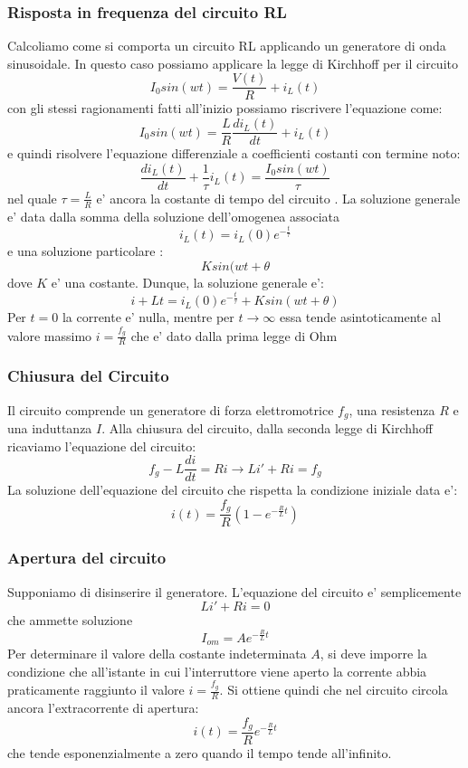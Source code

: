 \documentclass[a4paper, 10pt]{article}
\begin{document}
			\subsubsection{Risposta in frequenza del circuito RL}
				Calcoliamo come si comporta un circuito RL applicando un generatore di onda sinusoidale. In questo caso
				possiamo applicare la legge di Kirchhoff per il circuito 
				\[ I_0 sin(w t) = \frac{V(t)}{R} + i_L (t) \]
				con gli stessi ragionamenti fatti all'inizio possiamo riscrivere l'equazione come:
				\[ I_0 sin(wt) =  \frac{L}{R}\frac{di_L (t)}{dt} + i_L (t) \]
				e quindi risolvere l'equazione differenziale a coefficienti costanti con termine noto:
				\[ \frac{di_L (t)}{dt} + \frac{1}{\tau}i_L (t) = \frac{I_0 sin(wt)}{\tau}\]
				nel quale $\tau =\frac{L}{R}$ e' ancora la costante di tempo del circuito . La soluzione generale e' data
				dalla somma della soluzione dell'omogenea associata 
				\[ i_L(t) = i_L(0) e^{-\frac{t}{\tau}}\] e una soluzione particolare : \[ K sin(wt + \theta \] dove $K$ e' una
				costante. Dunque, la soluzione generale e':
				\[ i+L{t} = i_L(0)e^{-\frac{t}{\tau}} + Ksin(wt + \theta) \]
				Per $t = 0$ la corrente e' nulla, mentre per $t \rightarrow \infty$ essa tende asintoticamente al valore
				massimo $i = \frac{f_g}{R}$ che e' dato dalla prima legge di Ohm
			\subsubsection{Chiusura del Circuito}
				Il circuito comprende un generatore di forza elettromotrice $f_g$, una resistenza $R$ e una induttanza $I$.
				Alla chiusura del circuito, dalla seconda legge di Kirchhoff ricaviamo l'equazione del circuito:
				\[ f_g - L\frac{di}{dt} = Ri \rightarrow Li' + Ri = f_g \]
				La soluzione dell'equazione del circuito che rispetta la condizione iniziale data e':
				\[ i(t) = \frac{f_g}{R}(1 - e^{-\frac{R}{L}t}) \]
			\subsubsection{Apertura del circuito}
				Supponiamo di disinserire il generatore. L'equazione del circuito e' semplicemente \[Li' + Ri = 0\] che ammette
				soluzione \[I_{om} = Ae^{-\frac{R}{L}t} \] Per determinare il valore della costante indeterminata $A$, si deve
				imporre la condizione che all'istante in cui l'interruttore viene aperto la corrente abbia praticamente raggiunto
				il valore  $i = \frac{f_g}{R}$. Si ottiene quindi che nel circuito circola ancora l'extracorrente di apertura:
				\[ i(t) = \frac{f_g}{R}e^{-\frac{R}{L}t}\] che tende esponenzialmente a zero quando il tempo tende all'infinito.		
			
\end{document}
